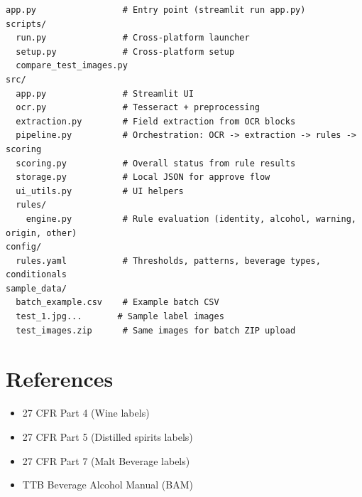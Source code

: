 \documentclass[11pt,a4paper]{article}
\begin{document}
\begin{lstlisting}
app.py                 # Entry point (streamlit run app.py)
scripts/
  run.py               # Cross-platform launcher
  setup.py             # Cross-platform setup
  compare_test_images.py
src/
  app.py               # Streamlit UI
  ocr.py               # Tesseract + preprocessing
  extraction.py        # Field extraction from OCR blocks
  pipeline.py          # Orchestration: OCR -> extraction -> rules -> scoring
  scoring.py           # Overall status from rule results
  storage.py           # Local JSON for approve flow
  ui_utils.py          # UI helpers
  rules/
    engine.py          # Rule evaluation (identity, alcohol, warning, origin, other)
config/
  rules.yaml           # Thresholds, patterns, beverage types, conditionals
sample_data/
  batch_example.csv    # Example batch CSV
  test_1.jpg...       # Sample label images
  test_images.zip      # Same images for batch ZIP upload
\end{lstlisting}

\section{References}

\begin{itemize}
    \item 27 CFR Part 4 (Wine labels)
    \item 27 CFR Part 5 (Distilled spirits labels)
    \item 27 CFR Part 7 (Malt Beverage labels)
    \item TTB Beverage Alcohol Manual (BAM)
\end{itemize}
\end{document}
